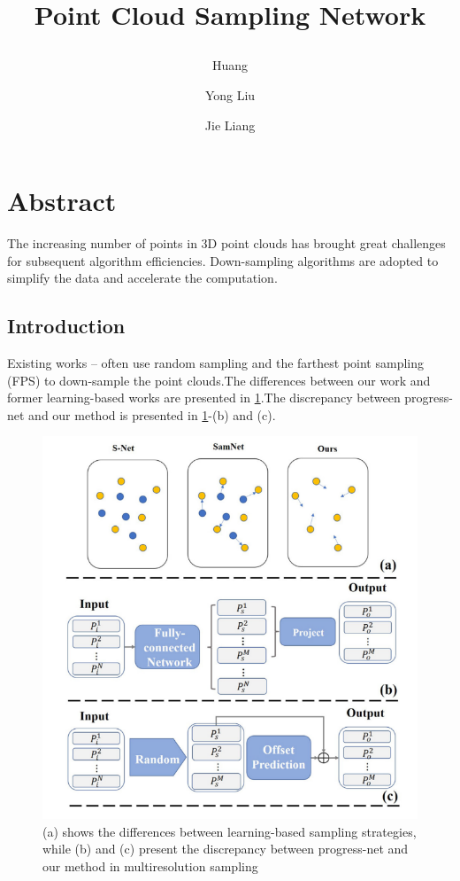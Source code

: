 \documentclass[14pt]{article}
\title{\raggedright{Point Cloud Sampling Network}}
\author[a]{\raggedright{Huang}}
\author[a,*]{\raggedright{Yong Liu}}
\author[a,b]{\raggedright{Jie Liang}}
\affil[a]{\raggedright{Laboratory of Advanced Perception on Robotics and Intelligent Learning, College of Control Science and Engineering, Zhejiang University, Hangzhou, China}}
\affil[b]{\raggedright{Institute of Mechanical and Electrical Engineering, Beijing, China}}
\date{}
\begin{document}
\maketitle

\section{Abstract}
The increasing number of points in 3D point clouds has brought great challenges for subsequent algorithm efficiencies. Down-sampling algorithms are adopted to simplify the data and accelerate the computation.

\begin{multicols}{2}
\section{Introduction}
Existing works \cite{1}–\cite{2} often use random sampling and the farthest point sampling (FPS) to down-sample the point clouds.The differences between our work and former learning-based works are presented in \ref{fig:fig1}.The discrepancy between progress-net and our method is presented in \ref{fig:fig1}-(b) and (c).

\begin{figure}[H]
\includegraphics[scale=0.5]{image1}
\caption{(a) shows the differences between learning-based sampling strategies, while (b) and (c) present the discrepancy between progress-net and our method in multiresolution sampling}
\label{fig:fig1}
\end{figure}


\end{multicols}
\end{document}

